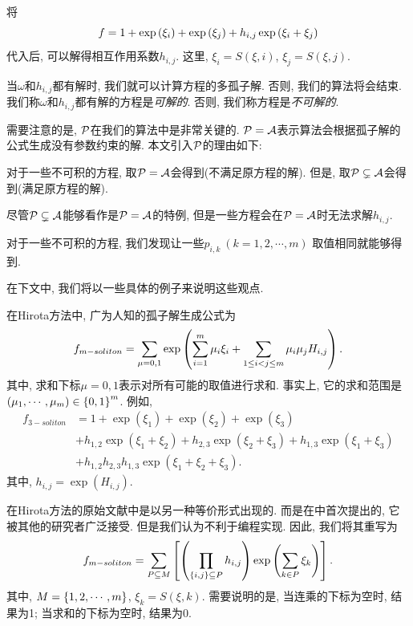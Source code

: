 将
\begin{equation}
    f=1+\exp\left(\xi_i\right)+\exp\left(\xi_j\right)+h_{i,j}\exp\left(\xi_i+\xi_j\right) \label{hij}
\end{equation}
代入后, 可以解得相互作用系数$h_{i,j}$. 这里, $\xi_i=S(\xi,i)$, $\xi_j=S(\xi,j)$.

当$\omega$和$h_{i,j}$都有解时, 我们就可以计算方程的多孤子解. 否则, 我们的算法将会结束. 我们称$\omega$和$h_{i,j}$都有解的方程是\emph{可解的}. 否则, 我们称方程是\emph{不可解的}.

需要注意的是, $\mathcal{P}$在我们的算法中是非常关键的. $\mathcal{P}= \mathcal{A}$表示算法会根据孤子解的公式生成没有参数约束的解. 本文引入$\mathcal{P}$的理由如下: 
\begin{compactenum}[1. ]
\item 对于一些不可积的方程, 取$\mathcal{P}= \mathcal{A}$会得到\emph{\FalseSol{}}(不满足原方程的解). 但是, 取$\mathcal{P}\subsetneq  \mathcal{A}$会得到\emph{\TrueSol{}}(满足原方程的解).
\item 尽管$\mathcal{P}\subsetneq  \mathcal{A}$能够看作是$\mathcal{P}= \mathcal{A}$的特例, 但是一些方程会在$\mathcal{P}= \mathcal{A}$时无法求解$h_{i,j}$.
\item 对于一些不可积的方程, 我们发现让一些$p_{i,k}~(k=1,2,\cdots,m)$ 取值相同就能够得到\TrueSol{}.
\end{compactenum}
在下文中, 我们将以一些具体的例子来说明这些观点. 

在Hirota方法中, 广为人知的孤子解生成公式为\cite{hirota1973exact}
\begin{equation}
    f_{m-soliton}=\sum_{\mu=0,1}\exp\left(\sum_{i=1}^m{\mu_i \xi_i}+\sum_{1\le i<j\le m}{\mu_i\mu_jH_{i,j}}\right). \label{f-soliton-old}
\end{equation}
其中, 求和下标$\mu=0,1$表示对所有可能的取值进行求和. 事实上, 它的求和范围是$\left(\mu_1,\cdots,\mu_m\right)\in \left\{0,1\right\}^m$. 例如, 
\begin{equation}
\begin{split}
f_{3-soliton}&=1+\exp(\xi_1)+\exp(\xi_2)+\exp(\xi_3)\\
&+h_{1,2}\exp(\xi_1+\xi_2)+h_{2,3}\exp(\xi_2+\xi_3)+h_{1,3}\exp(\xi_1+\xi_3)\\
&+h_{1,2}h_{2,3}h_{1,3}\exp(\xi_1+\xi_2+\xi_3).
\end{split}
\end{equation}
其中, $h_{i,j}=\exp(H_{i,j})$.

在Hirota方法的原始文献\cite{hirota1971exact}中是以另一种等价形式出现的. 而是在中首次提出的, 它被其他的研究者广泛接受. 但是我们认为不利于编程实现. 因此, 我们将其重写为
\begin{equation}
    f_{m-soliton}=\sum_{P\subseteq M}\left[\left(\prod_{\left\{i,j\right\}\subseteq P}{h_{i,j}}\right)\exp\left(\sum_{k\in P}{\xi_k}\right)\right]. \label{f-soliton-new}
\end{equation}
其中, $M=\left\{1,2,\cdots,m\right\}$, $\xi_k=S(\xi,k)$. 需要说明的是, 当连乘的下标为空时, 结果为1; 当求和的下标为空时, 结果为0. 

